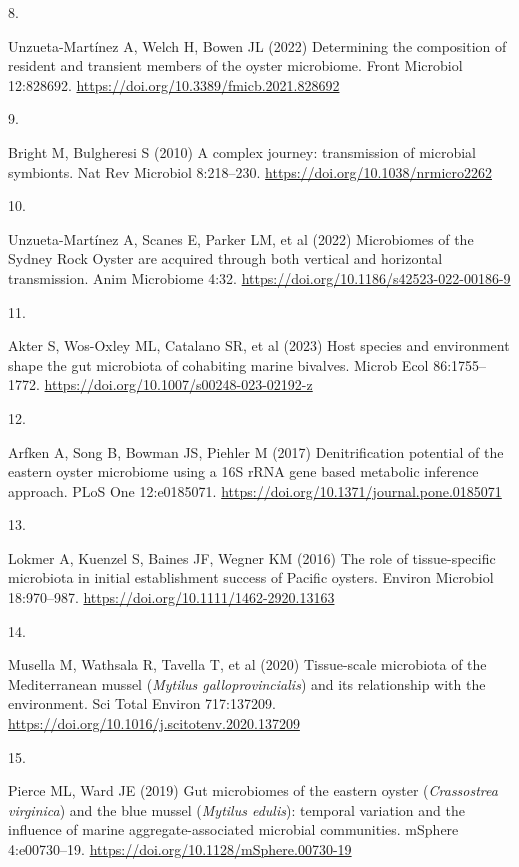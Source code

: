 \documentclass[
  12 pt,
]{article}
\newlength{\cslhangindent}
\newlength{\csllabelwidth}
\newenvironment{CSLReferences}[2] %
 {\begin{list}{}{%
  \setlength{\itemindent}{0pt}
  \setlength{\leftmargin}{0pt}
  \setlength{\parsep}{0pt}
  \ifodd #1
   \setlength{\leftmargin}{\cslhangindent}
   \setlength{\itemindent}{-1\cslhangindent}
  \fi
  \setlength{\itemsep}{#2\baselineskip}}}
 {\end{list}}
\newcommand{\CSLLeftMargin}[1]{\parbox[t]{\csllabelwidth}{\strut#1\strut}}
\newcommand{\CSLRightInline}[1]{\parbox[t]{\linewidth - \csllabelwidth}{\strut#1\strut}}
\begin{document}
\begin{CSLReferences}{0}{0}
\CSLLeftMargin{8. }%
\CSLRightInline{Unzueta-Martínez A, Welch H, Bowen JL (2022) Determining the composition of resident and transient members of the oyster microbiome. Front Microbiol 12:828692. \url{https://doi.org/10.3389/fmicb.2021.828692}}

\CSLLeftMargin{9. }%
\CSLRightInline{Bright M, Bulgheresi S (2010) A complex journey: transmission of microbial symbionts. Nat Rev Microbiol 8:218--230. \url{https://doi.org/10.1038/nrmicro2262}}

\CSLLeftMargin{10. }%
\CSLRightInline{Unzueta-Martínez A, Scanes E, Parker LM, et al (2022) Microbiomes of the {Sydney Rock Oyster} are acquired through both vertical and horizontal transmission. Anim Microbiome 4:32. \url{https://doi.org/10.1186/s42523-022-00186-9}}

\CSLLeftMargin{11. }%
\CSLRightInline{Akter S, Wos-Oxley ML, Catalano SR, et al (2023) Host species and environment shape the gut microbiota of cohabiting marine bivalves. Microb Ecol 86:1755--1772. \url{https://doi.org/10.1007/s00248-023-02192-z}}

\CSLLeftMargin{12. }%
\CSLRightInline{Arfken A, Song B, Bowman JS, Piehler M (2017) Denitrification potential of the eastern oyster microbiome using a {16S rRNA} gene based metabolic inference approach. PLoS One 12:e0185071. \url{https://doi.org/10.1371/journal.pone.0185071}}

\CSLLeftMargin{13. }%
\CSLRightInline{Lokmer A, Kuenzel S, Baines JF, Wegner KM (2016) The role of tissue-specific microbiota in initial establishment success of {Pacific} oysters. Environ Microbiol 18:970--987. \url{https://doi.org/10.1111/1462-2920.13163}}

\CSLLeftMargin{14. }%
\CSLRightInline{Musella M, Wathsala R, Tavella T, et al (2020) Tissue-scale microbiota of the {Mediterranean} mussel ({{\emph{Mytilus galloprovincialis}}}) and its relationship with the environment. Sci Total Environ 717:137209. \url{https://doi.org/10.1016/j.scitotenv.2020.137209}}

\CSLLeftMargin{15. }%
\CSLRightInline{Pierce ML, Ward JE (2019) Gut microbiomes of the eastern oyster ({{\emph{Crassostrea virginica}}}) and the blue mussel ({{\emph{Mytilus edulis}}}): temporal variation and the influence of marine aggregate-associated microbial communities. mSphere 4:e00730--19. \url{https://doi.org/10.1128/mSphere.00730-19}}


\end{CSLReferences}
\end{document}
